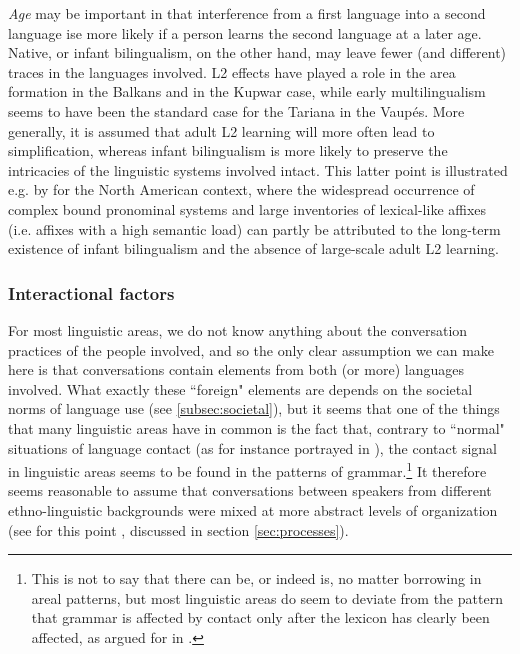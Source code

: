 \documentclass[output=paper,
modfonts
]{langscibook}
\begin{document}
\textit{Age} may be important in that interference from a first language into a second language ise more likely if a person learns the second language at a later age. Native, or infant bilingualism, on the other hand, may leave fewer (and different) traces in the languages involved. L2 effects have played a role in the area formation in the Balkans and in the Kupwar case, while early multilingualism seems to have been the standard case for the Tariana in the Vaupés. More generally, it is assumed that adult L2 learning will more often lead to simplification, whereas infant bilingualism is more likely to preserve the intricacies of the linguistic systems involved intact. This latter point is illustrated e.g. by \textcite{mithun2015morphological} for the North American context, where the widespread occurrence of complex bound pronominal systems and large inventories of lexical-like affixes (i.e. affixes with a high semantic load) can partly be attributed to the long-term existence of infant bilingualism and the absence of large-scale adult L2 learning.

\textit{}

\subsubsection{Interactional factors}

For most linguistic areas, we do not know anything about the conversation practices of the people involved, and so the only clear assumption we can make here is that conversations contain elements from both (or more) languages involved. What exactly these ``foreign" elements are depends on the societal norms of language use (see \ref{subsec:societal}), but it seems that one of the things that many linguistic areas have in common is the fact that, contrary to ``normal" situations of language contact (as for instance portrayed in \cite{thomasonetal1988language}), the contact signal in linguistic areas seems to be found in the patterns of grammar.\footnote{This is not to say that there can be, or indeed is, no matter borrowing in areal patterns, but most linguistic areas do seem to deviate from the pattern that grammar is affected by contact only after the lexicon has clearly been affected, as argued for in \cite{thomasonetal1988language}.} It therefore seems reasonable to assume that conversations between speakers from different ethno-linguistic backgrounds were mixed at more abstract levels of organization (see for this point \citealt{Matras2011Explaining}, discussed in section \ref{sec:processes}).
\end{document}
